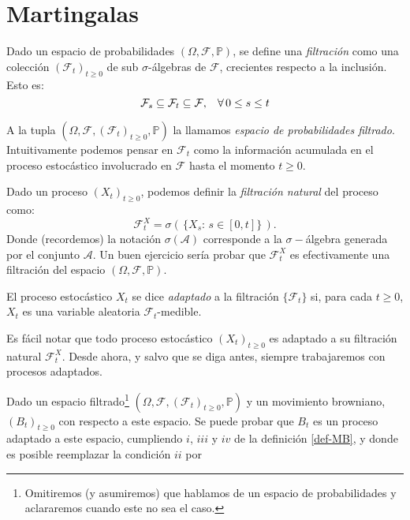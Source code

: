\section{Martingalas}
Dado un espacio de probabilidades $(\Omega,\mathcal{F},\mathbb{P})$, se define una \textit{filtración} como una colección $\left(\mathcal{F}_t\right)_{t\geq 0}$ de sub $\sigma$-álgebras de $\mathcal{F}$, crecientes respecto a la inclusión. Esto es: 
\[\mathcal{F}_s \subseteq \mathcal{F}_t \subseteq \mathcal{F},\hspace{0.3cm}\forall\,0\leq s\leq t\]

A la tupla $\left(\Omega,\mathcal{F},(\mathcal{F}_t)_{t\geq0},\mathbb{P}\right)$ la llamamos \textit{espacio de probabilidades filtrado}. Intuitivamente podemos pensar en $\mathcal{F}_t$ como la información acumulada en el proceso estocástico involucrado en $\mathcal{F}$ hasta el momento $t\geq 0$.

Dado un proceso $(X_t)_{t\geq0}$, podemos definir la \textit{filtración natural} del proceso como:
\[\mathcal{F}_t^X = \sigma\left(\,\{X_s:\,s\in[0,t]\}\,\right).\]
Donde (recordemos) la notación $\sigma(\mathcal{A})$ corresponde a la $\sigma-$álgebra generada por el conjunto $\mathcal{A}$. Un buen ejercicio sería probar que $\mathcal{F}_t^X$ es efectivamente una filtración del espacio $(\Omega, \mathcal{F},\mathbb{P})$.

\begin{definicion} El proceso estocástico $X_t$ se dice \textit{adaptado} a la filtración $\{\mathcal{F}_t\}$ si, para cada $t\geq 0$, $X_t$ es una variable aleatoria $\mathcal{F}_t$-medible.
\label{def_adaptado}
\end{definicion}
Es fácil notar que todo proceso estocástico $(X_t)_{t\geq0}$ es adaptado a su filtración natural $\mathcal{F}_t^X$. Desde ahora, y salvo que se diga antes, siempre trabajaremos con procesos adaptados.

Dado un espacio filtrado\footnote{Omitiremos (y asumiremos) que hablamos de un espacio de probabilidades y aclararemos cuando este no sea el caso.} $(\Omega, \mathcal{F},(\mathcal{F}_t)_{t\geq0},\mathbb{P})$ y un movimiento browniano, $(B_t)_{t\geq0}$ con respecto a este espacio. Se puede probar que $B_t$ es un proceso adaptado a este espacio, cumpliendo $i$, $iii$ y $iv$ de la definición \ref{def-MB}, y donde es posible reemplazar la condición $ii$ por

